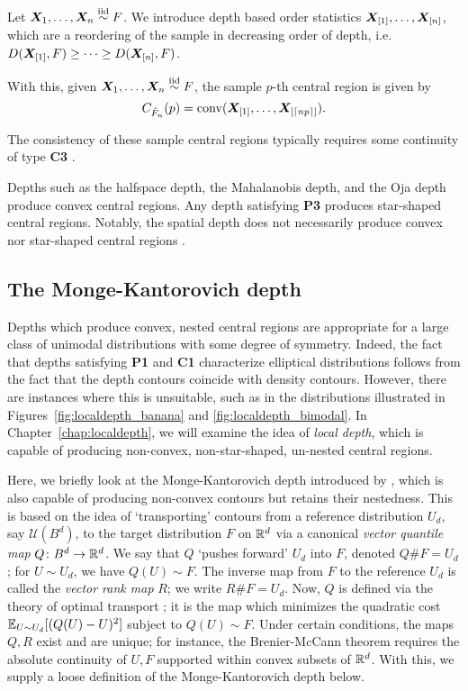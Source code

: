 \begin{definition}
    Let $\bm{X}_1, \dots, \bm{X}_n \overset{\text{iid}}{\sim} F$.
    We introduce depth based order statistics $\bm{X}_{[1]}, \dots, \bm{X}_{[n]}$,
    which are a reordering of the sample in decreasing order of depth, i.e.\
    $D(\bm{X}_{[1]}, F) \geq \dots \geq D(\bm{X}_{[n]}, F)$.
\end{definition}

With this, given $\bm{X}_1, \dots, \bm{X}_n \overset{\text{iid}}{\sim} F$, the sample $p$-th central
region is given by
\begin{equation}
    C_{\hat{F}_n}(p) = \operatorname{conv}(\bm{X}_{[1]}, \dots, \bm{X}_{[\lceil np \rceil]}).
\end{equation}

The consistency of these sample central regions typically requires some
continuity of type \textbf{C3} \parencite{liu-1990, donoho-gasko-1992,
he-wang-1997}.

Depths such as the halfspace depth, the Mahalanobis depth, and the Oja depth
produce convex central regions.
Any depth satisfying \textbf{P3} produces star-shaped central regions.
Notably, the spatial depth does not necessarily produce convex nor star-shaped
central regions \parencite{nagy-2017}.


\subsection{The Monge-Kantorovich depth}

Depths which produce convex, nested central regions are appropriate for a
large class of unimodal distributions with some degree of symmetry.
Indeed, the fact that depths satisfying \textbf{P1} and \textbf{C1}
characterize elliptical distributions follows from the fact that the depth
contours coincide with density contours.
However, there are instances where this is unsuitable, such as in the
distributions illustrated in Figures~\ref{fig:localdepth_banana} and
\ref{fig:localdepth_bimodal}.
In Chapter~\ref{chap:localdepth}, we will examine the idea of \emph{local
depth}, which is capable of producing non-convex, non-star-shaped, un-nested
central regions.

Here, we briefly look at the Monge-Kantorovich depth introduced by
\textcite{chernozhukov-galichon-hallin-henry-2017}, which is also capable of
producing non-convex contours but retains their nestedness.
This is based on the idea of `transporting' contours from a reference
distribution $U_d$, say $\mathcal{U}(B^d)$, to the target distribution $F$ on
$\mathbb{R}^d$ via a canonical \emph{vector quantile map} $Q\colon B^d \to \mathbb{R}^d$.
We say that $Q$ `pushes forward' $U_d$ into $F$, denoted $Q\#F = U_d$; for $U
\sim U_d$, we have $Q(U) \sim F$.
The inverse map from $F$ to the reference $U_d$ is called the \emph{vector
rank map} $R$; we write $R\#F = U_d$.
Now, $Q$ is defined via the theory of optimal transport
\parencite{villani-2003}; it is the map which minimizes the quadratic cost
$\operatorname{\mathbb{E}}_{U \sim U_d}[(Q(U) - U)^2]$ subject to $Q(U) \sim F$.
Under certain conditions, the maps $Q, R$ exist and are unique; for instance,
the Brenier-McCann theorem requires the absolute continuity of $U, F$
supported within convex subsets of $\mathbb{R}^d$.
With this, we supply a loose definition of the Monge-Kantorovich depth below.

